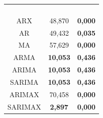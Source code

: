 \begin{table}[H]
\begin{subtable}{0.46\linewidth}
\begin{tabular}{@{}ccc@{}}
			& & \\
			& & \\
			& & \\
			& & \\ \midrule
			ARX & 48,870 & \textbf{0,000} \\
			AR & 49,432 & \textbf{0,035} \\
			MA & 57,629 & \textbf{0,000} \\
			ARMA & \textbf{10,053} & \textbf{0,436} \\
			ARIMA & \textbf{10,053} & \textbf{0,436} \\
			SARIMA & \textbf{10,053} & \textbf{0,436} \\
			ARIMAX & 70,458 & \textbf{0,000} \\
			SARIMAX & \textbf{2,897} & \textbf{0,000} \\ \bottomrule
		\end{tabular}
	\end{subtable}
	
	
	\vspace{0.5cm}
	
\end{table}





